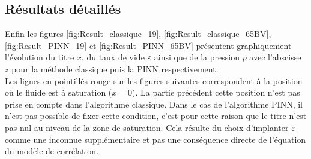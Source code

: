 \subsection{Résultats détaillés}

Enfin les figures \ref{fig:Result_classique_19}, \ref{fig:Result_classique_65BV}, \ref{fig:Result_PINN_19} et \ref{fig:Result_PINN_65BV} présentent graphiquement l'évolution du titre $x$, du taux de vide $\varepsilon$ ainsi que de la pression $p$ avec l'abscisse $z$ pour la méthode classique puis la PINN respectivement.\\


Les lignes en pointillés rouge sur les figures suivantes correspondent à la position où le fluide est à saturation ($x=0$). La partie précédent cette position n'est pas prise en compte dans l'algorithme classique. Dans le cas de l'algorithme PINN, il n'est pas possible de fixer cette condition, c'est pour cette raison que le titre n'est pas nul au niveau de la zone de saturation. Cela résulte du choix d'implanter $\varepsilon$ comme une inconnue supplémentaire et pas une conséquence directe de l'équation du modèle de corrélation.\\



